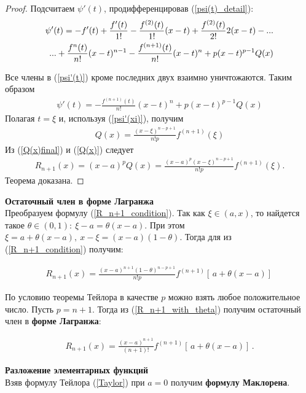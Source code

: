 \begin{proof}
    Подсчитаем $\psi'(t)$, продифференцировав (\ref{psi(t)_detail}):
    \begin{align}\label{psi'(t)}
        \psi'(t) = -f'(t) + \frac{f'(t)}{1!} - \frac{f^{(2)}(t)}{1!}(x-t) + \frac{f^{(2)}(t)}{2!}2(x-t) - ... \notag \\
        ... + \frac{f^n(t)}{n!}(x-t)^{n-1} - \frac{f^{(n+1)}(t)}{n!}(x-t)^n + p(x-t)^{p-1}Q(x)
      \end{align}

    Все члены в (\ref{psi'(t)}) кроме последних двух взаимно уничтожаются. Таким образом
    \begin{align}
        \psi'(t) = - \frac{f^{(n+1)}(t)}{n!}(x-t)^n + p(x-t)^{p-1}Q(x)
    \end{align}
    Полагая $t = \xi$ и, используя (\ref{psi'(xi)}), получим
    \begin{align}\label{Q(x)final}
        Q(x) = \frac{(x-\xi)^{n-p+1}}{n!p}f^{(n+1)}(\xi)
    \end{align}
    Из (\ref{Q(x)final}) и (\ref{Q(x)}) следует
    \begin{align*}
        R_{n+1}(x) = (x-a)^pQ(x) = \frac{(x-a)^p(x-\xi)^{n-p+1}}{n!p}f^{(n+1)}(\xi).
    \end{align*}
    Теорема доказана.
\end{proof}

\textbf{Остаточный член в форме Лагранжа} \\
Преобразуем формулу (\ref{R_n+1_condition}). Так как $\xi \in (a,x)$, то найдется такое $\theta \in (0,1): \ \xi -a = \theta(x-a)$. При этом $\xi = a + \theta(x-a), \ x-\xi = (x-a)(1-\theta)$. Тогда для из (\ref{R_n+1_condition}) получим:

\begin{align}\label{R_n+1_with_theta}
    R_{n+1}(x) = \frac{(x-a)^{n+1}(1-\theta)^{n-p+1}}{n!p} f^{(n+1)}[\,a + \theta(x-a)]\,
\end{align}

По условию теоремы Тейлора в качестве $p$ можно взять любое положительное число. Пусть $p = n + 1$.
Тогда из (\ref{R_n+1_with_theta}) получим остаточный член в \textbf{форме Лагранжа}:

\begin{align}
    R_{n+1}(x) = \frac{(x-a)^{n+1}}{(n+1)!}f^{(n+1)}[\,a + \theta(x-a)]\,.
\end{align}


\textbf{Разложение элементарных функций}\\
Взяв формулу Тейлора (\ref{Taylor}) при $a=0$ получим \textbf{формулу Маклорена}.

